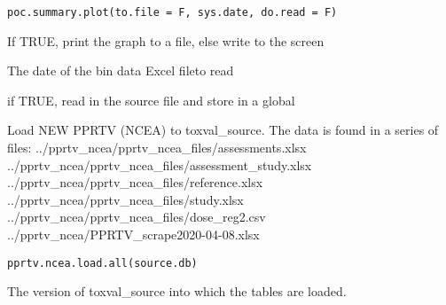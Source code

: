 \documentclass[letterpaper]{book}
\begin{document}
%
\begin{Usage}
\begin{verbatim}
poc.summary.plot(to.file = F, sys.date, do.read = F)
\end{verbatim}
\end{Usage}
%
\begin{Arguments}
\begin{ldescription}
\item[\code{to.file}] If TRUE, print the graph to a file, else write to the screen

\item[\code{sys.date}] The date of the bin data Excel fileto read

\item[\code{do.read}] if TRUE, read in the source file and store in a global
\end{ldescription}
\end{Arguments}
%
\begin{Description}\relax
Load NEW PPRTV (NCEA) to toxval\_source. The data is found in a series of files:
../pprtv\_ncea/pprtv\_ncea\_files/assessments.xlsx
../pprtv\_ncea/pprtv\_ncea\_files/assessment\_study.xlsx
../pprtv\_ncea/pprtv\_ncea\_files/reference.xlsx
../pprtv\_ncea/pprtv\_ncea\_files/study.xlsx
../pprtv\_ncea/pprtv\_ncea\_files/dose\_reg2.csv
../pprtv\_ncea/PPRTV\_scrape2020-04-08.xlsx
\end{Description}
%
\begin{Usage}
\begin{verbatim}
pprtv.ncea.load.all(source.db)
\end{verbatim}
\end{Usage}
%
\begin{Arguments}
\begin{ldescription}
\item[\code{source.db}] The version of toxval\_source into which the tables are loaded.
\end{ldescription}
\end{Arguments}
\end{document}

